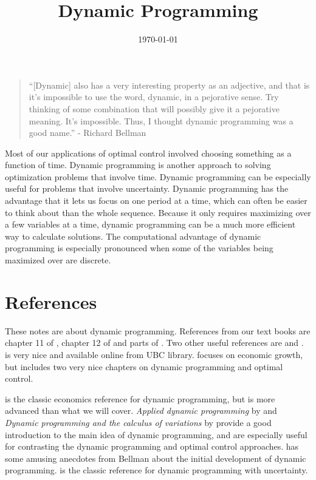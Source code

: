  

\title{Dynamic Programming}
\date{\today}



\maketitle

\begin{quotation}
  ``[Dynamic] also has a very interesting property as an adjective, and
  that is it’s impossible to use the word, dynamic, in a pejorative
  sense. Try thinking of some combination that will possibly give it a
  pejorative meaning.  It’s impossible. Thus, I thought dynamic
  programming was a good name.'' - Richard Bellman
\end{quotation}

Most of our applications of optimal control involved choosing
something as a function of time. Dynamic programming is another
approach to solving optimization problems that involve time. Dynamic
programming can be especially useful for problems that involve
uncertainty. Dynamic programming has the advantage
that it lets us focus on one period at a time, which can often be
easier to think about than the whole sequence. Because it only
requires maximizing over a few variables at a time, dynamic
programming can be a much more efficient way to calculate
solutions. The computational advantage of dynamic programming is
especially pronounced when some of the variables being maximized over
are discrete. 

\section{References}

These notes are about dynamic programming.  References from our text
books are chapter 11 of \cite{dixit1990}, chapter 12 of
\cite{fuente2000} and parts of \cite{carter2001}. Two other useful
references are \cite{adda2003} and
\cite{acemoglu2008}. \cite{adda2003} is very nice and available online
from UBC library.  \cite{acemoglu2008} focuses on economic growth, but
includes two very nice chapters on dynamic programming and optimal
control.

\cite{stokey1989} is the classic economics reference for dynamic
programming, but is more advanced than what we will cover.
\textit{Applied dynamic programming} by \cite{bellman1962} and
\textit{Dynamic programming and the calculus of variations} by
\cite{dreyfus1965} provide a good introduction to the main idea of
dynamic programming, and are especially useful for contrasting the
dynamic programming and optimal control approaches.
\cite{dreyfus2002} has some amusing anecdotes from Bellman about the
initial development of dynamic programming.  \cite{bertsekas1976} is
the classic reference for dynamic programming with uncertainty.

